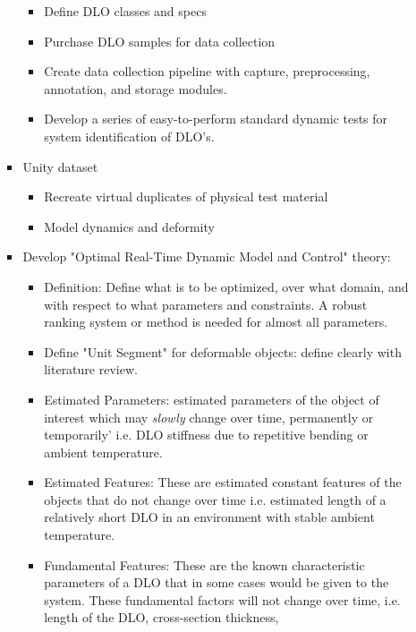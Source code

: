 \documentclass[11pt]{article}
\begin{document}
\begin{itemize}
\begin{itemize}
\begin{itemize}
\begin{itemize}
                  \item Define DLO classes and specs
                  \item Purchase DLO samples for data collection
                  \item Create data collection pipeline with capture, preprocessing,
                  annotation, and storage modules.
                  \item Develop a series of easy-to-perform standard dynamic tests
                  for system identification of DLO's.
            \end{itemize}
            \item Unity dataset
            \begin{itemize}
                  \item Recreate virtual duplicates of physical test material
                  \item Model dynamics and deformity
            \end{itemize}
            \item Develop "Optimal Real-Time Dynamic Model and Control" theory:
            \begin{itemize}
                  \item Definition: Define what is to be optimized, over what domain,
                  and with respect to what parameters and constraints. A robust
                  ranking system or method is needed for almost all parameters.
                  \item Define "Unit Segment" for deformable objects: define clearly
                  with literature review.
                  \item Estimated Parameters: estimated parameters of the object of
                  interest which may \textit{slowly} change over time, permanently
                  or temporarily' i.e. DLO stiffness due to repetitive bending or
                  ambient temperature.
                  \item Estimated Features: These are estimated constant features of
                  the objects that do not change over time i.e. estimated length of a
                  relatively short DLO in an environment with stable ambient
                  temperature.
                  \item Fundamental Features: These are the known characteristic
                  parameters of a DLO that in some cases would be given to the system.
                  These fundamental factors will not
                  change over time, i.e. length of the DLO, cross-section thickness,

\end{itemize}
\end{itemize}
\end{itemize}
\end{itemize}
\end{document}
